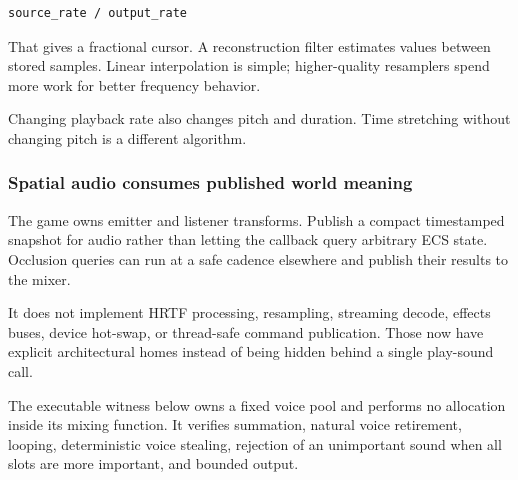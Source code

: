 \begin{verbatim}
source_rate / output_rate
\end{verbatim}

That gives a fractional cursor. A reconstruction filter estimates values between stored samples. Linear interpolation is simple; higher-quality resamplers spend more work for better frequency behavior.

Changing playback rate also changes pitch and duration. Time stretching without changing pitch is a different algorithm.

\subsubsection{Spatial audio consumes published world meaning}\label{05-engine-i-ch009-spatial-audio-consumes-published-world-meaning}

The game owns emitter and listener transforms. Publish a compact timestamped snapshot for audio rather than letting the callback query arbitrary ECS state. Occlusion queries can run at a safe cadence elsewhere and publish their results to the mixer.

It does not implement HRTF processing, resampling, streaming decode, effects buses, device hot-swap, or thread-safe command publication. Those now have explicit architectural homes instead of being hidden behind a single play-sound call.

The executable witness below owns a fixed voice pool and performs no allocation inside its mixing function. It verifies summation, natural voice retirement, looping, deterministic voice stealing, rejection of an unimportant sound when all slots are more important, and bounded output.

